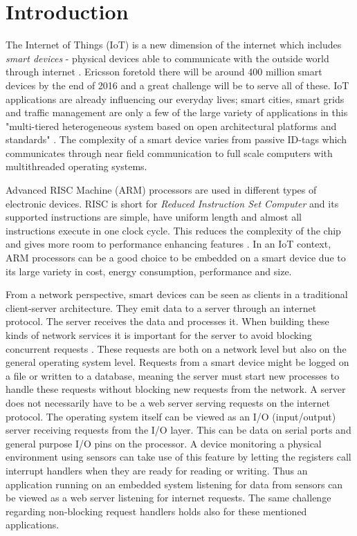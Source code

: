 \chapter{Introduction}
\label{cha:introduction}

The Internet of Things (IoT) is a new dimension of the internet which includes
\textit{smart devices} - physical devices able to communicate with the outside
world through internet
\cite{design-principles-for-distributed-embedded-applications}. Ericsson
foretold there will be around 400 million smart devices by the end of 2016
\cite{ericsson-iot-forecast} and a great challenge will be to serve all of
these. IoT applications are already influencing our everyday lives; smart
cities, smart grids and traffic management are only a few of the large variety
of applications in this "multi-tiered heterogeneous system based on open
architectural platforms and standards" \cite{gardavsevic2017iot}. The
complexity of a smart device varies from passive ID-tags which communicates
through near field communication to full scale computers with multithreaded
operating systems.

Advanced RISC Machine (ARM) processors are used in different types of
electronic devices. RISC is short for \textit{Reduced Instruction Set Computer}
and its supported instructions are simple, have uniform length and almost all
instructions execute in one clock cycle. This reduces the complexity of the
chip and gives more room to performance enhancing features \cite{risc-vs-cisc}.
In an IoT context, ARM processors can be a good choice to be embedded on a
smart device due to its large variety in cost, energy consumption, performance
and size. 

From a network perspective, smart devices can be seen as clients in a
traditional client-server architecture. They emit data to a server through an
internet protocol. The server receives the data and processes it. When building
these kinds of network services it is important for the server to avoid
blocking concurrent requests \cite{elmeleegy2004lazy}. These requests are both
on a network level but also on the general operating system level. Requests
from a smart device might be logged on a file or written to a database, meaning
the server must start new processes to handle these requests without blocking
new requests from the network. A server does not necessarily have to be a web
server serving requests on the internet protocol. The operating system itself
can be viewed as an I/O (input/output) server receiving requests from the I/O
layer. This can be data on serial ports and general purpose I/O pins on the
processor. A device monitoring a physical environment using sensors can take
use of this feature by letting the registers call interrupt handlers when they
are ready for reading or writing. Thus an application running on an embedded
system listening for data from sensors can be viewed as a web server listening
for internet requests. The same challenge regarding non-blocking request
handlers holds also for these mentioned applications.

